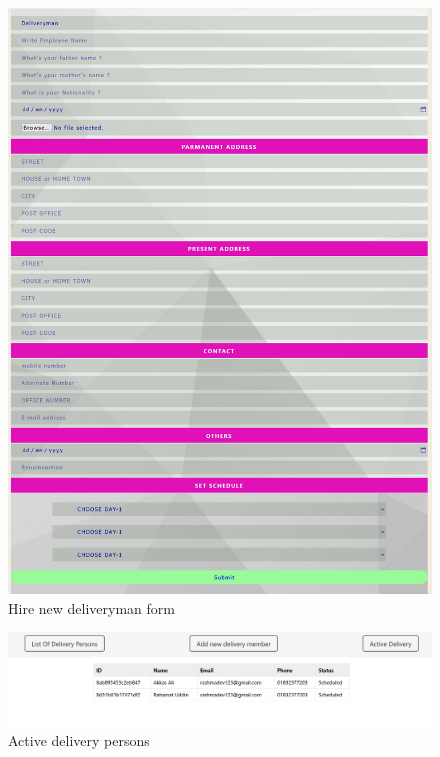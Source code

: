 \begin{figure}[ht]
    \centering  
    \includegraphics[width=\textwidth, height=0.8\textheight, keepaspectratio]{designs/Add new deliveryman.png}    
    \caption{Hire new deliveryman form}
    \label{fig:fig 6.2.28}
\end{figure}
\begin{figure}[ht]
    \centering  
    \includegraphics[width=\textwidth, height=0.8\textheight, keepaspectratio]{designs/list of delivery person.png}    
    \caption{Active delivery persons}
    \label{fig:fig 6.2.29}
\end{figure}
